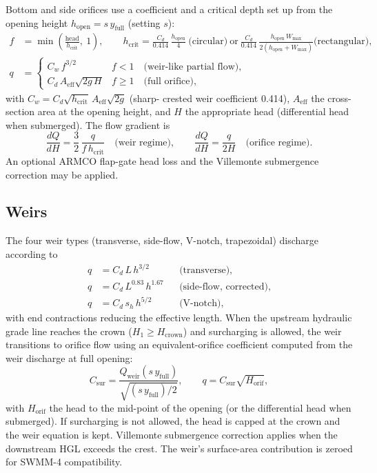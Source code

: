 \documentclass[11pt,a4paper]{article}
\begin{document}
Bottom and side orifices use a coefficient and a critical depth set up from the
opening height $h_{\mathrm{open}} = s\,y_{\mathrm{full}}$ (setting $s$):
\begin{align}
  f &= \min\!\left(\frac{\text{head}}{h_{\mathrm{crit}}},\ 1\right),
  \qquad h_{\mathrm{crit}} = \frac{C_d}{0.414}\,\frac{h_{\mathrm{open}}}
    {4}\ \text{(circular)}\ \text{or}\ \frac{C_d}{0.414}\,
    \frac{h_{\mathrm{open}}\,W_{\max}}{2(h_{\mathrm{open}} + W_{\max})}
    \text{(rectangular)},\\
  q &= \begin{cases}
    C_w\,f^{3/2} & f < 1 \quad\text{(weir-like partial flow)},\\
    C_d\,A_{\mathrm{eff}}\sqrt{2g\,H} & f \ge 1 \quad\text{(full orifice)},
  \end{cases}
\end{align}
with $C_w = C_d\sqrt{h_{\mathrm{crit}}}\,A_{\mathrm{eff}}\sqrt{2g}$ (sharp-
crested weir coefficient 0.414), $A_{\mathrm{eff}}$ the cross-section area at
the opening height, and $H$ the appropriate head (differential head when
submerged). The flow gradient is
\begin{equation}
  \frac{dQ}{dH} = \frac{3}{2}\,\frac{q}{f\,h_{\mathrm{crit}}}
  \quad\text{(weir regime)}, \qquad
  \frac{dQ}{dH} = \frac{q}{2H}
  \quad\text{(orifice regime)}.
\end{equation}
An optional ARMCO flap-gate head loss and the Villemonte submergence correction
may be applied.

\subsection{Weirs}

The four weir types (transverse, side-flow, V-notch, trapezoidal) discharge
according to
\begin{equation}
  \begin{aligned}
    q &= C_d\,L\,h^{3/2} &&\text{(transverse)},\\
    q &= C_d\,L^{0.83}\,h^{1.67} &&\text{(side-flow, corrected)},\\
    q &= C_d\,s_h\,h^{5/2} &&\text{(V-notch)},
  \end{aligned}
\end{equation}
with end contractions reducing the effective length. When the upstream
hydraulic grade line reaches the crown ($H_1 \ge H_{\mathrm{crown}}$) and
surcharging is allowed, the weir transitions to orifice flow using an
equivalent-orifice coefficient computed from the weir discharge at full
opening:
\begin{equation}
  C_{\mathrm{sur}} = \frac{Q_{\mathrm{weir}}(s\,y_{\mathrm{full}})}
    {\sqrt{(s\,y_{\mathrm{full}})/2}},
  \qquad
  q = C_{\mathrm{sur}}\sqrt{H_{\mathrm{orif}}},
\end{equation}
with $H_{\mathrm{orif}}$ the head to the mid-point of the opening (or the
differential head when submerged). If surcharging is not allowed, the head is
capped at the crown and the weir equation is kept. Villemonte submergence
correction applies when the downstream HGL exceeds the crest. The weir's
surface-area contribution is zeroed for SWMM-4 compatibility.
\end{document}

